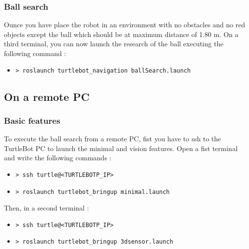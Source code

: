 \documentclass[10pt,a4paper]{article}
\begin{document}
\subsubsection{Ball search}

Ounce you have place the robot in an environment with no obstacles and no red objects except the ball which should be at maximum distance of 1.80 m. On a third terminal, you can now launch the research of the ball executing the following command :

\begin{itemize}
\item[]  \begin{verbatim}> roslaunch turtlebot_navigation ballSearch.launch \end{verbatim}
\end{itemize}

\subsection{On a remote PC}

\subsubsection{Basic features}

To execute the ball search from a remote PC, fist you have to ssh to the TurtleBot PC to launch the minimal and vision features. Open a fist terminal and write the following commands :

\begin{itemize}
\item[]  \begin{verbatim}> ssh turtle@<TURTLEBOTP_IP> \end{verbatim}
\item[]  \begin{verbatim}> roslaunch turtlebot_bringup minimal.launch \end{verbatim}
\end{itemize}

Then, in a second terminal :

\begin{itemize}
\item[]  \begin{verbatim}> ssh turtle@<TURTLEBOTP_IP> \end{verbatim}
\item[]  \begin{verbatim}> roslaunch turtlebot_bringup 3dsensor.launch \end{verbatim}
\end{itemize}
\end{document}

